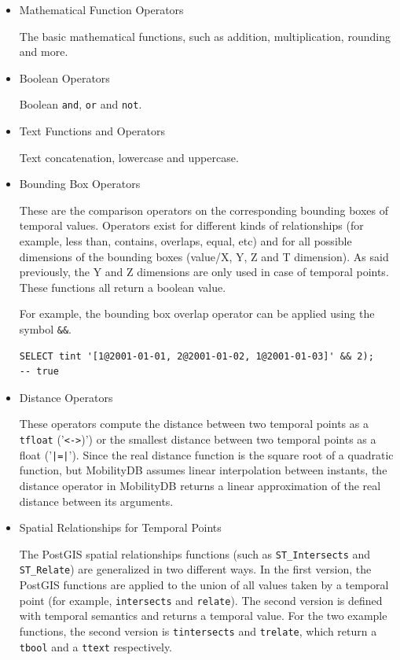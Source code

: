 \begin{itemize}
    \item Mathematical Function Operators

        The basic mathematical functions, such as addition, multiplication, rounding and more.

    \item Boolean Operators

        Boolean \lstinline{and}, \lstinline{or} and \lstinline{not}.

    \item Text Functions and Operators

        Text concatenation, lowercase and uppercase.

    \item Bounding Box Operators

        These are the comparison operators on the corresponding bounding boxes of temporal values. Operators exist for different kinds of relationships (for example, less than, contains, overlaps, equal, etc) and for all possible dimensions of the bounding boxes (value/X, Y, Z and T dimension). As said previously, the Y and Z dimensions are only used in case of temporal points. These functions all return a boolean value.

        For example, the bounding box overlap operator can be applied using the symbol \lstinline{&&}.
        \begin{lstlisting}
SELECT tint '[1@2001-01-01, 2@2001-01-02, 1@2001-01-03]' && 2);
-- true
        \end{lstlisting}

    \item Distance Operators

        These operators compute the distance between two temporal points as a \lstinline{tfloat} ('\lstinline+<->+)') or the smallest distance between two temporal points as a float ('\lstinline+|=|+'). Since the real distance function is the square root of a quadratic function, but MobilityDB assumes linear interpolation between instants, the distance operator in MobilityDB returns a linear approximation of the real distance between its arguments.

    \item Spatial Relationships for Temporal Points

        The PostGIS spatial relationships functions (such as \lstinline{ST_Intersects} and \lstinline{ST_Relate}) are generalized in two different ways. In the first version, the PostGIS functions are applied to the union of all values taken by a temporal point (for example, \lstinline{intersects} and \lstinline{relate}). The second version is defined with temporal semantics and returns a temporal value. For the two example functions, the second version is \lstinline{tintersects} and \lstinline{trelate}, which return a \lstinline{tbool} and a \lstinline{ttext} respectively.


\end{itemize}
